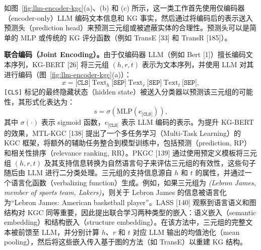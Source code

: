 \documentclass[11pt,UTF8,fontset=fandol]{ctexart}
\begin{document}
如图~\ref{fig:llm-encoder-kgc}(a)、(b) 和 (c) 所示，这一类工作首先使用仅编码器（encoder-only）LLM 编码文本信息和 KG 事实，然后通过将编码后的表示送入预测头（prediction head）来预测三元组或被遮蔽实体的合理性。预测头可以是简单的 MLP 或传统的 KG 评分函数（例如 TransE [33] 和 TransR [185]）。

\textbf{联合编码（Joint Encoding）。}由于仅编码器 LLM（例如 Bert [1]）擅长编码文本序列，KG-BERT [26] 将三元组 $(h, r, t)$ 表示为文本序列，并使用 LLM 对其进行编码（图~\ref{fig:llm-encoder-kgc}(a)）：
\begin{equation}
x = \texttt{[CLS]}\ \text{Text}_h\ \texttt{[SEP]}\ \text{Text}_r\ \texttt{[SEP]}\ \text{Text}_t\ \texttt{[SEP]}, \tag{5}
\end{equation}
\texttt{[CLS]} 标记的最终隐藏状态（hidden state）被送入分类器以预测该三元组的可能性，其形式化表达为：
\begin{equation}
s = \sigma(\text{MLP}(e_{\texttt{[CLS]}})), \tag{6}
\end{equation}
其中 $\sigma(\cdot)$ 表示 sigmoid 函数，$e_{\texttt{[CLS]}}$ 表示 LLM 编码的表示。为提升 KG-BERT 的效果，MTL-KGC [138] 提出了一个多任务学习（Multi-Task Learning）的 KGC 框架，将额外的辅助任务整合到模型训练中，包括预测（prediction, RP）和相关性排序（relevance ranking, RR）。PKGC [139] 通过使用预定义模板将三元组 $(h, r, t)$ 及其支持信息转换为自然语言句子来评估三元组的有效性，这些句子随后由 LLM 进行二分类处理。三元组的支持信息源自 $h$ 和 $t$ 的属性，并通过一个语言化函数（verbalizing function）生成。例如，如果三元组为 \textit{(Lebron James, member of sports team, Lakers)}，则关于 Lebron James 的信息被语言化为``Lebron James: American basketball player''。LASS [140] 观察到语言语义和图结构对 KGC 同等重要，因此提出联合学习两种类型的嵌入：语义嵌入（semantic embedding）和结构嵌入（structure embedding）。在该方法中，三元组的完整文本被前馈至 LLM，并分别计算 $h$、$r$ 和 $t$ 对应 LLM 输出的均值池化（mean pooling），然后将这些嵌入传入基于图的方法（如 TransE）以重建 KG 结构。
\end{document}

